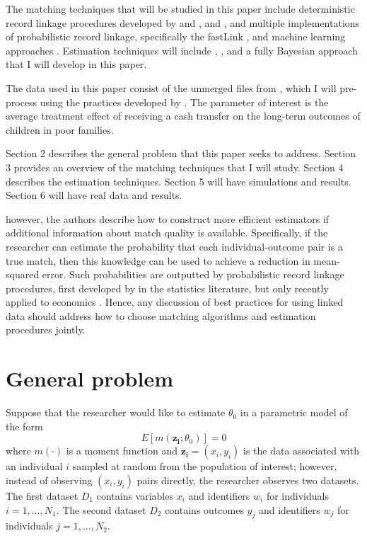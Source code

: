 \documentclass[12pt]{article}
\begin{document}
The matching techniques that will be studied in this paper include deterministic record linkage procedures developed by \cite{ferrie96} and \cite{abe2012, abe2014, abe2017}, and \cite{aizer2016}, and multiple implementations of probabilistic record linkage, specifically the fastLink \cite{enamorado2019}, and machine learning approaches \cite{Feigenbaum2016AML}. Estimation techniques will include \cite{ahl2019}, \cite{lahiri05}, and a fully Bayesian approach that I will develop in this paper. 

The data used in this paper consist of the unmerged files from \cite{aizer2016}, which I will pre-process using the practices developed by \cite{arp2018}.  The parameter of interest is the average treatment effect of receiving a cash transfer on the long-term outcomes of children in poor families.   

Section 2 describes the general problem that this paper seeks to address.  Section 3 provides an overview of the matching techniques that I will study.  Section 4 describes the estimation techniques.  Section 5 will have simulations and results.  Section 6 will have real data and results. 


however, the authors describe how to construct more efficient estimators if additional information about match quality is available.  Specifically, if the researcher can estimate the probability that each individual-outcome pair is a true match, then this knowledge can be used to achieve a reduction in mean-squared error.  Such probabilities are outputted by probabilistic record linkage procedures, first developed by \cite{fellegi69} in the statistics literature, but only recently applied to economics \cite{arp2018}. Hence, any discussion of best practices for using linked data should address how to choose matching algorithms and estimation procedures jointly.  


\section{General problem}
Suppose that the researcher would like to estimate $\theta_0$ in a parametric model of the form
\begin{equation} E[m(\mathbf{z_i}; \theta_0)] = 0 \label{model} \end{equation}
where $m(\cdot)$ is a moment function and $\mathbf{z_i} = (x_i, y_i)$ is the data associated with an individual $i$ sampled at random from the population of interest; however, instead of observing $(x_i, y_i)$ pairs directly, the researcher observes two datasets.  The first dataset $D_1$ contains variables $x_i$ and identifiers $w_i$ for individuals $i = 1, \dots, N_1$.  The second dataset $D_2$ contains outcomes $y_j$ and identifiers $w_j$ for individuals $j=1,\dots, N_2$.
\end{document}
